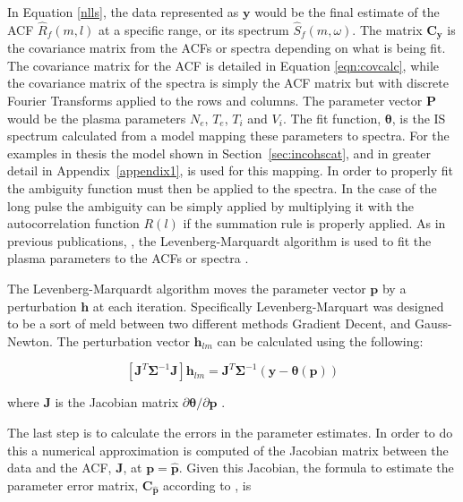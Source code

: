 In Equation \ref{nlls}, the data represented as $\mathbf{y}$ would be the final estimate of the ACF $\widehat{R}_f(m,l)$ at a specific range, or its spectrum $\widehat{S}_f(m,\omega)$. The matrix $\mathbf{C}_{\mathbf{y}}$  is the covariance matrix from the ACFs or spectra depending on what is being fit. The covariance matrix for the ACF is detailed in Equation \ref{eqn:covcalc}, while the covariance matrix of the spectra is simply the ACF matrix but with discrete Fourier Transforms applied to the rows and columns. The parameter vector $\mathbf{P}$ would be the plasma parameters $N_e$, $T_e$, $T_i$ and $V_i$. The fit function, $\bm{\theta}$, is the IS spectrum calculated from a model mapping these parameters to spectra. For the examples in thesis the model shown in Section~\ref{sec:incohscat}, and in greater detail in Appendix~\ref{appendix1}, is used for this mapping. In order to properly fit the ambiguity function must then be applied to the spectra. In the case of the long pulse the ambiguity can be simply applied by multiplying it with the autocorrelation function $R(l)$ if the summation rule is properly applied. As in previous publications, \cite{nikoukar2008}, the Levenberg-Marquardt algorithm is used to fit the plasma parameters to the ACFs or spectra \cite{levenberg1944,marquardt:1963}.

The Levenberg-Marquardt algorithm moves the parameter vector $\mathbf{p}$ by a perturbation $\mathbf{h}$ at each iteration\cite{gavin:2013}. Specifically Levenberg-Marquart was designed to be a sort of meld between two different methods Gradient Decent, and Gauss-Newton. The perturbation vector $\mathbf{h}_{lm}$ can be calculated using the following:

\begin{equation}
\left[ \mathbf{J}^T\bm{\Sigma}^{-1}\mathbf{J}\right]\mathbf{h}_{lm} =\mathbf{J}^T\bm{\Sigma}^{-1}(\mathbf{y}-\bm{\theta}(\mathbf{p}))
\label{hlm}
\end{equation}

\noindent where $\mathbf{J}$ is the Jacobian matrix $\partial \bm{\theta}/\partial \mathbf{p}$ \cite{levenberg1944,marquardt:1963}. 

The last step is to calculate the errors in the parameter estimates. In order to do this a numerical approximation is computed of the Jacobian matrix between the data and the ACF, $\mathbf{J}$, at $\mathbf{p}=\mathbf{\hat{p}}$. Given this Jacobian, the formula to estimate the parameter error matrix, $\mathbf{C}_{\mathbf{\hat{p}}}$ according to \cite{Hysell:2000cq}, is

